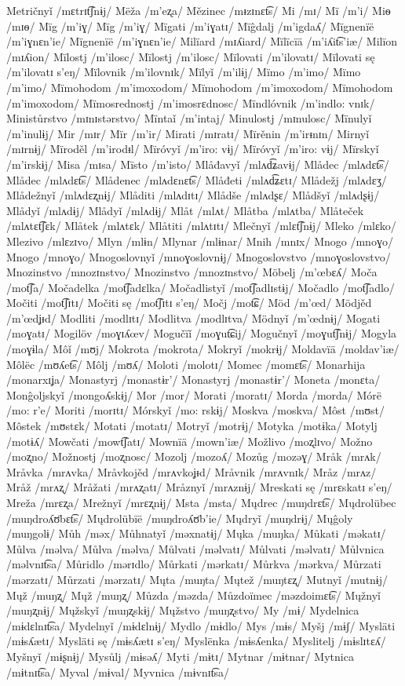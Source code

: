Metričnyǐ /mɛtrɪt͡ʃnɨj/
Mëža /m’eʐa/
Mězinec /mᵻzɪnɛt͡s/
Mi /mɪ/
Mï /m’i/
Miѳ /mɪѳ/
Mïg /m’iɣ/
Mïg /m’iɣ/
Mïgati /m’iɣatɪ/
Mïĝdalj /m’igdaʎ/
Mïgnenïë /m’iɣnɛn’ie/
Mïgnenïë /m’iɣnɛn’ie/
Milïard /mɪʎiard/
Mïlïcïä /m’iʎit͡s’iæ/
Milïon /mɪʎion/
Mïlostj /m’ilosc/
Mïlostj /m’ilosc/
Mïlovati /m’ilovatɪ/
Mïlovati sę /m’ilovatɪ s’eŋ/
Mïlovnik /m’ilovnɪk/
Mïlyǐ /m’ilɨj/
Mïmo /m’imo/
Mïmo /m’imo/
Mïmohodom /m’imoxodom/
Mïmohodom /m’imoxodom/
Mïmohodom /m’imoxodom/
Mïmosrednostj /m’imosrɛdnosc/
Mïndlóvnik /m’indlo: vnɪk/
Ministůrstvo /mɪnɪstərstvo/
Mïntaǐ /m’intaj/
Minulostj /mɪnulosc/
Mïnulyǐ /m’inulɨj/
Mir /mɪr/
Mïr /m’ir/
Mirati /mɪratɪ/
Mïrěnin /m’irᵻnɪn/
Mirnyǐ /mɪrnɨj/
Mïroděl /m’irodᵻl/
Mïróvyǐ /m’iro: vɨj/
Mïróvyǐ /m’iro: vɨj/
Mïrskyǐ /m’irskɨj/
Misa /mɪsa/
Mïsto /m’isto/
Mlåđavyǐ /mlʌd͡ʑavɨj/
Mlådec /mlʌdɛt͡s/
Mlådec /mlʌdɛt͡s/
Mlådenec /mlʌdɛnɛt͡s/
Mlåđeti /mlʌd͡ʑɛtɪ/
Mlådežj /mlʌdɛʒ/
Mlådežnyǐ /mlʌdɛʐnɨj/
Mlåditi /mlʌdɪtɪ/
Mlådše /mlʌdʂɛ/
Mlådšyǐ /mlʌdʂɨj/
Mlådyǐ /mlʌdɨj/
Mlådyǐ /mlʌdɨj/
Mlåt /mlʌt/
Mlåtba /mlʌtba/
Mlåteček /mlʌtɛt͡ʃɛk/
Mlåtek /mlʌtɛk/
Mlåtiti /mlʌtɪtɪ/
Mlečnyǐ /mlɛt͡ʃnɨj/
Mleko /mlɛko/
Mlezivo /mlɛzɪvo/
Mlyn /mlɨn/
Mlynar /mlɨnar/
Mnih /mnɪx/
Mnogo /mnoɣo/
Mnogo /mnoɣo/
Mnogoslovnyǐ /mnoɣoslovnɨj/
Mnogoslovstvo /mnoɣoslovstvo/
Mnozinstvo /mnozɪnstvo/
Mnozinstvo /mnozɪnstvo/
Möbelj /m’œbɛʎ/
Moča /mot͡ʃa/
Močadelka /mot͡ʃadɛlka/
Močadlistyǐ /mot͡ʃadlɪstɨj/
Močadlo /mot͡ʃadlo/
Močiti /mot͡ʃɪtɪ/
Močiti sę /mot͡ʃɪtɪ s’eŋ/
Močj /mot͡ɕ/
Möd /m’œd/
Mödjěd /m’œdʝᵻd/
Modliti /modlɪtɪ/
Modlitva /modlɪtva/
Mödnyǐ /m’œdnɨj/
Mogati /moɣatɪ/
Mogilöv /moɣɪʎœv/
Mogučïǐ /moɣut͡ɕij/
Mogučnyǐ /moɣut͡ʃnɨj/
Mogyla /moɣɨla/
Môǐ /mʊj/
Mokrota /mokrota/
Mokryǐ /mokrɨj/
Moldavïä /moldav’iæ/
Môlëc /mʊʎet͡s/
Môlj /mʊʎ/
Moloti /molotɪ/
Momec /momɛt͡s/
Monarhija /monarxɪʝa/
Monastyrj /monastɨr’/
Monastyrj /monastɨr’/
Moneta /monɛta/
Monĝoljskyǐ /mongoʎskɨj/
Mor /mor/
Morati /moratɪ/
Morda /morda/
Mórë /mo: r’e/
Moriti /morɪtɪ/
Mórskyǐ /mo: rskɨj/
Moskva /moskva/
Môst /mʊst/
Môstek /mʊstɛk/
Motati /motatɪ/
Motryǐ /motrɨj/
Motyka /motɨka/
Motylj /motɨʎ/
Mowčati /mowt͡ʃatɪ/
Mownïä /mown’iæ/
Možlivo /moʐlɪvo/
Možno /moʐno/
Možnostj /moʐnosc/
Mozolj /mozoʎ/
Mozůg /mozəɣ/
Mråk /mrʌk/
Mråvka /mrʌvka/
Mråvkojěd /mrʌvkoʝᵻd/
Mråvnik /mrʌvnɪk/
Mråz /mrʌz/
Mråž /mrʌʐ/
Mråžati /mrʌʐatɪ/
Mråznyǐ /mrʌznɨj/
Mreskati sę /mrɛskatɪ s’eŋ/
Mreža /mrɛʐa/
Mrežnyǐ /mrɛʐnɨj/
Msta /msta/
Mųdrec /muŋdrɛt͡s/
Mųdrolübec /muŋdroʎʊ̈bɛt͡s/
Mųdrolübïë /muŋdroʎʊ̈b’ie/
Mųdryǐ /muŋdrɨj/
Mųĝoly /muŋgolɨ/
Můh /məx/
Můhnatyǐ /məxnatɨj/
Mųka /muŋka/
Můkati /məkatɪ/
Můlva /məlva/
Můlva /məlva/
Můlvati /məlvatɪ/
Můlvati /məlvatɪ/
Můlvnica /məlvnɪt͡sa/
Můridlo /mərɪdlo/
Můrkati /mərkatɪ/
Můrkva /mərkva/
Můrzati /mərzatɪ/
Můrzati /mərzatɪ/
Mųta /muŋta/
Mųtež /muŋtɛʐ/
Mutnyǐ /mutnɨj/
Mųž /muŋʐ/
Mųž /muŋʐ/
Můzda /məzda/
Můzdoïmec /məzdoimɛt͡s/
Mųžnyǐ /muŋʐnɨj/
Mųžskyǐ /muŋʐskɨj/
Mųžstvo /muŋʐstvo/
My /mɨ/
Mydelnica /mɨdɛlnɪt͡sa/
Mydelnyǐ /mɨdɛlnɨj/
Mydlo /mɨdlo/
Mys /mɨs/
Myšj /mɨʃ/
Mysläti /mɨsʎætɪ/
Mysläti sę /mɨsʎætɪ s’eŋ/
Myslënka /mɨsʎenka/
Myslitelj /mɨslɪtɛʎ/
Myšnyǐ /mɨʂnɨj/
Mysůlj /mɨsəʎ/
Myti /mɨtɪ/
Mytnar /mɨtnar/
Mytnica /mɨtnɪt͡sa/
Myval /mɨval/
Myvnica /mɨvnɪt͡sa/